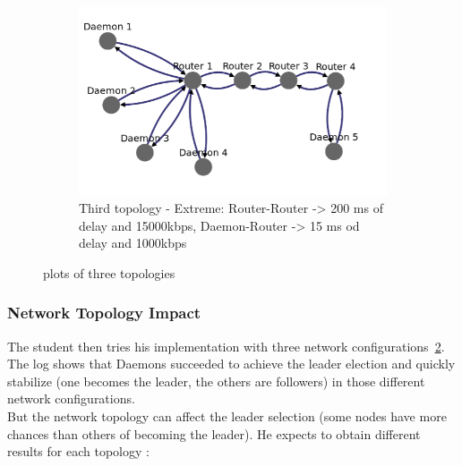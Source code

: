 \documentclass{eplmastersthesis}
\begin{document}
\begin{figure}[H]
\begin{subfigure}{0.6\textwidth}
              \includegraphics[width=1.0\linewidth]{figures/user_case/raft_topo_3.png}
              \caption{Third topology - Extreme: Router-Router -> 200 ms of delay and 15000kbps, Daemon-Router -> 15 ms od delay and 1000kbps}
              \label{fig:topo3}
            \end{subfigure}
            \caption{plots of three topologies}
            \label{fig:topologies}
          \end{figure}

        \subsubsection{Network Topology Impact}

          The student then tries his implementation with three network
          configurations~\ref{fig:topologies}.\\
          The log shows that Daemons succeeded to achieve the leader
          election and quickly stabilize (one becomes the leader, the others
          are followers) in those different network configurations.\\
          But the network topology can affect the leader selection (some nodes
          have more chances than others of becoming the leader). He expects to
          obtain different results for each topology :
\end{document}
